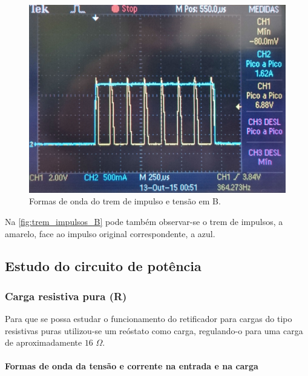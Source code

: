 \documentclass[a4paper,11pt]{article}
\numberwithin{equation}{section}
\begin{document}
\begin{figure}[H]
	\centering
	\includegraphics[keepaspectratio=true, scale=0.09]{img/figs/trem_impulsos_B}
	\caption{Formas de onda do trem de impulso e tensão em B.}
	\label{fig:trem_impulsos_B}
	\vspace{-0.8em}
\end{figure}

Na \autoref{fig:trem_impulsos_B} pode também observar-se o trem de impulsos, a amarelo, face ao impulso original correspondente, a azul.


\subsection{Estudo do circuito de potência}

\subsubsection{Carga resistiva pura (R)}

Para que se possa estudar o funcionamento do retificador para cargas do tipo resistivas puras utilizou-se um reóstato como carga, regulando-o para uma carga de aproximadamente $16$ $\Omega$.

\paragraph{Formas de onda da tensão e corrente na entrada e na carga}\mbox{}\
\end{document}
